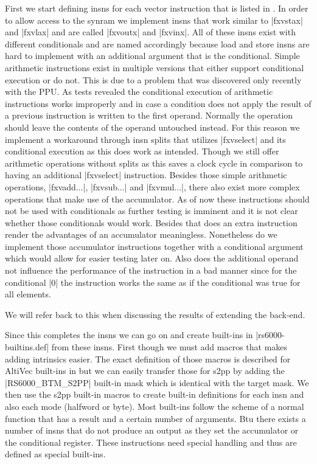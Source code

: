 First we start defining insns for each vector instruction that is listed in \cite{nuxmanual}.
In order to allow access to the synram we implement insns that work similar to |fxvstax| and |fxvlax| and are called |fxvoutx| and |fxvinx|.
All of these insns exist with different conditionals and are named accordingly because load and store insns are hard to implement with an additional argument that is the conditional.
Simple arithmetic instructions exist in multiple versions that either support conditional execution or do not.
This is due to a problem that was discovered only recently with the PPU.
As tests revealed the conditional execution of arithmetic instructions works improperly and in case a condition does not apply the result of a previous instruction is written to the first operand.
Normally the operation should leave the contents of the operand untouched instead.
For this reason we implement a workaround through insn splits that utilizes |fxvselect| and its conditional execution as this does work as intended.
Though we still offer arithmetic operations without splits as this saves a clock cycle in comparison to having an additional |fxvselect| instruction.
Besides those simple arithmetic operations, |fxvadd...|, |fxvsub...| and |fxvmul...|, there also exist more complex operations that make use of the accumulator.
As of now these instructions should not be used with conditionals as further testing is imminent and it is not clear whether those conditionals would work.
Besides that does an extra instruction render the advantages of an accumulator meaningless.
Nonetheless do we implement those accumulator instructions together with a conditional argument which would allow for easier testing later on.
Also does the additional operand not influence the performance of the instruction in a bad manner since for the conditional |0| the instruction works the same as if the conditional was true for all elements.

We will refer back to this when discussing the results of extending the back-end.

Since this completes the insns we can go on and create built-ins in |rs6000-builtins.def| from these insns.
First though we must add macros that makes adding intrinsics easier.
The exact definition of those macros is described for AltiVec built-ins in \cite{heimbrecht} but we can easily transfer those for s2pp by adding the |RS6000_BTM_S2PP| built-in mask which is identical with the target mask.
We then use the s2pp built-in macros to create built-in definitions for each insn and also each mode (halfword or byte).
Most built-ins follow the scheme of a normal function that has a result and a certain number of arguments.
Btu there exists a number of insns that do not produce an output as they set the accumulator or the conditional register.
These instructions need special handling and thus are defined as special built-ins.

